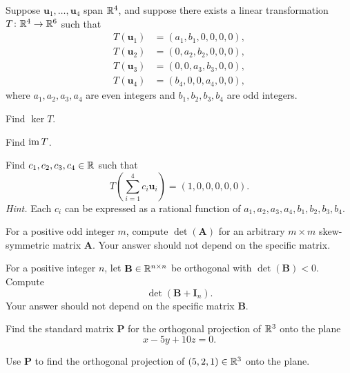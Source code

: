 \begin{problem}
Suppose $\mathbf u_1,\dots,\mathbf u_4$ span $\mathbb{R}^4$, and suppose there exists a linear transformation $T\colon\mathbb{R}^4\to\mathbb{R}^6$ such that
\[
\begin{aligned}
T(\mathbf u_1)&=(a_1,b_1,0,0,0,0),\\
T(\mathbf u_2)&=(0,a_2,b_2,0,0,0),\\
T(\mathbf u_3)&=(0,0,a_3,b_3,0,0),\\
T(\mathbf u_4)&=(b_4,0,0,a_4,0,0),
\end{aligned}
\]
where $a_1,a_2,a_3,a_4$ are even integers and $b_1,b_2,b_3,b_4$ are odd integers.
\begin{problemsubparts}
\item Find $\ker T$.
\item Find $\operatorname{im} T$.
\item Find $c_1,c_2,c_3,c_4\in\mathbb{R}$ such that
\[
T\left(\sum_{i=1}^4 c_i\mathbf u_i\right)=(1,0,0,0,0,0).
\]
\textit{Hint.} Each $c_i$ can be expressed as a rational function of
$a_1,a_2,a_3,a_4,b_1,b_2,b_3,b_4$.
\end{problemsubparts}
\end{problem}

\begin{problem}
\begin{problemsubparts}
\item For a positive odd integer $m$, compute $\det(\mathbf A)$ for an arbitrary $m\times m$ skew-symmetric matrix $\mathbf A$. Your answer should not depend on the specific matrix.
\item For a positive integer $n$, let $\mathbf B\in\mathbb{R}^{n\times n}$ be orthogonal with $\det(\mathbf B)<0$. Compute
\[
\det(\mathbf B+\mathbf I_n).
\]
Your answer should not depend on the specific matrix $\mathbf B$.
\end{problemsubparts}
\end{problem}

\begin{problem}
\begin{problemsubparts}
\item Find the standard matrix $\mathbf P$ for the orthogonal projection of $\mathbb{R}^3$ onto the plane
\[
x-5y+10z=0.
\]
\item Use $\mathbf P$ to find the orthogonal projection of $(5,2,1)\in\mathbb{R}^3$ onto the plane.
\end{problemsubparts}
\end{problem}

